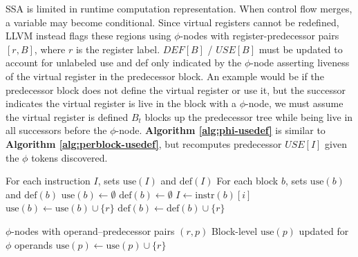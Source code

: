 \documentclass{article}
\begin{document}
SSA is limited in runtime computation representation. When control flow merges, a variable may become conditional. Since virtual registers cannot be redefined, LLVM instead flags these regions using $\phi$-nodes with register-predecessor pairs $[r, B]$, where $r$ is the register label. $\textit{DEF}[B]$ / $\textit{USE}[B]$ must be updated to account for unlabeled use and def only indicated by the $\phi$-node asserting liveness of the virtual register in the predecessor block. An example would be if the predecessor block does not define the virtual register or use it, but the successor indicates the virtual register is live in the block with a $\phi$-node, we must assume the virtual register is defined $B_t$ blocks up the predecessor tree while being live in all successors before the $\phi$-node. \textbf{Algorithm \ref{alg:phi-usedef}} is similar to \textbf{Algorithm \ref{alg:perblock-usedef}}, but recomputes predecessor $\textit{USE}[I]$ given the $\phi$ tokens discovered. 

\begin{algorithm}[H]
\label{alg:useordef}
\caption{Per-Block Use/Def}\label{alg:perblock-usedef}
\begin{algorithmic}[1]
\Require For each instruction $I$, sets $\mathrm{use}(I)$ and $\mathrm{def}(I)$
\Ensure For each block $b$, sets $\mathrm{use}(b)$ and $\mathrm{def}(b)$
    \State $\mathrm{use}(b) \gets \emptyset$
    \State $\mathrm{def}(b) \gets \emptyset$
        \State $I \gets \mathrm{instr}(b)[i]$
                \State $\mathrm{use}(b) \gets \mathrm{use}(b) \cup \{r\}$
            \EndIf
        \EndFor
            \State $\mathrm{def}(b) \gets \mathrm{def}(b) \cup \{r\}$
        \EndFor
    \EndFor
\EndFor
\end{algorithmic}
\end{algorithm}

\begin{algorithm}[H]
\caption{Phi Uses (Predecessor Folding)}\label{alg:phi-usedef}
\begin{algorithmic}[1]
\Require $\phi$-nodes with operand–predecessor pairs $(r,p)$
\Ensure Block-level $\mathrm{use}(p)$ updated for $\phi$ operands
                \State $\mathrm{use}(p) \gets \mathrm{use}(p) \cup \{r\}$
            \EndIf
        \EndFor
    \EndFor
\EndFor
\end{algorithmic}
\end{algorithm}
\end{document}
